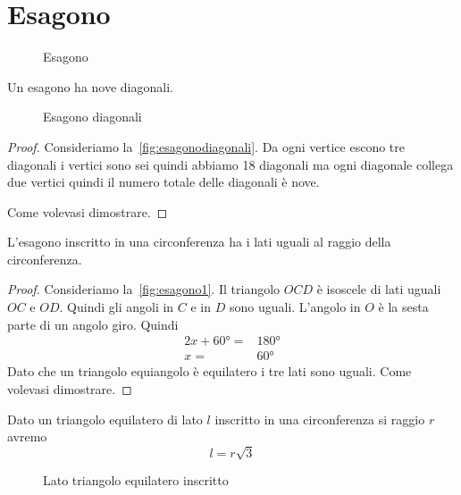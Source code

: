 \section{Esagono}
\begin{figure}
	\centering
	
	\caption{Esagono}
	\label{fig:esagono1}
\end{figure}
\begin{thm}[Diagonali]
	Un esagono ha nove diagonali.
\end{thm}

\begin{figure}
	\centering
	
	\caption{Esagono diagonali}
	\label{fig:esagonodiagonali}
\end{figure}
\begin{proof}
	Consideriamo la~\vref{fig:esagonodiagonali}. Da ogni vertice escono tre diagonali i vertici sono sei quindi abbiamo \num{18} diagonali ma ogni diagonale collega due vertici quindi il numero totale delle diagonali è nove. 
	
	Come volevasi dimostrare.
\end{proof}
\begin{thm}\label{thm:latoesagonoinscritto}
	L'esagono inscritto in una circonferenza ha i lati uguali al raggio della circonferenza.
\end{thm}
\begin{proof}
	Consideriamo la~\vref{fig:esagono1}. Il triangolo $OCD$ è isoscele di lati uguali $OC$ e $OD$. Quindi gli angoli in $C$ e in $D$ sono uguali. L'angolo in $O$ è la sesta parte di un angolo giro. Quindi
	\begin{align*} 
		2x+\ang{60}=&\ang{180}\\
		x=&\ang{60}
	\end{align*} 
	Dato che un triangolo equiangolo è equilatero i tre lati sono uguali.
	Come volevasi dimostrare.
\end{proof}
\begin{cor}\label{cor:latotriangoloequilatero1}
	Dato un triangolo equilatero di lato $l$ inscritto in una circonferenza si raggio $r$ avremo  \[l=r\sqrt{3}\]
\end{cor}
\begin{figure}
	\centering
	
	\caption{Lato triangolo equilatero inscritto}
	\label{fig:latotriangoloequilatero1}
\end{figure}
